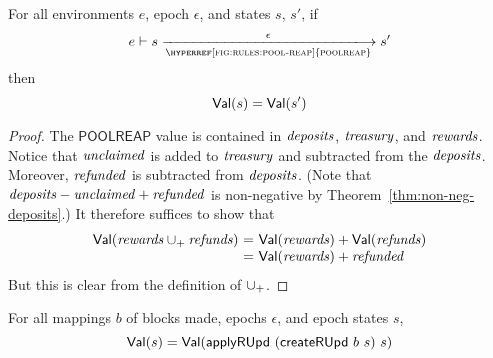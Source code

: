 \begin{lemma}
  \label{lemma:poolreap-pres-of-value}
  For all environments $e$, epoch $\epsilon$, and states $s$, $s'$, if
  \begin{equation*}
    e\vdash s\trans{\hyperref[fig:rules:pool-reap]{poolreap}}{\epsilon}s'
  \end{equation*}
  then
  \begin{equation*}
    \mathsf{Val}(s) = \mathsf{Val}(s')
  \end{equation*}
\end{lemma}

\begin{proof}
  The $\mathsf{POOLREAP}$ value is contained in
  $\mathit{deposits}$, $\mathit{treasury}$, and $\mathit{rewards}$.
  Notice that $\mathit{unclaimed}$ is added to $\mathit{treasury}$
  and subtracted from the $\mathit{deposits}$.
  Moreover, $\mathit{refunded}$ is subtracted from $\mathit{deposits}$.
  (Note that $\mathit{deposits}-\mathit{unclaimed}+\mathit{refunded}$
  is non-negative by Theorem~\ref{thm:non-neg-deposits}.)
  It therefore suffices to show that
  \begin{equation*}
    \begin{array}{r@{~=~}l}
    \Val(\var{rewards}\unionoverridePlus\var{refunds})
    & \Val(\var{rewards}) + \Val(\var{refunds})
    \\
    & \Val(\var{rewards}) + \var{refunded}
    \end{array}
  \end{equation*}
  But this is clear from the definition of $\mathbin{\cup_{+}}$.
\end{proof}

\begin{lemma}
  \label{lemma:ru-pres-of-value}
  For all mappings $b$ of blocks made, epochs $\epsilon$, and epoch states $s$,
  \begin{equation*}
    \mathsf{Val}(s) = \mathsf{Val}(\mathsf{applyRUpd}~(\mathsf{createRUpd}~b~s)~s)
  \end{equation*}
\end{lemma}

